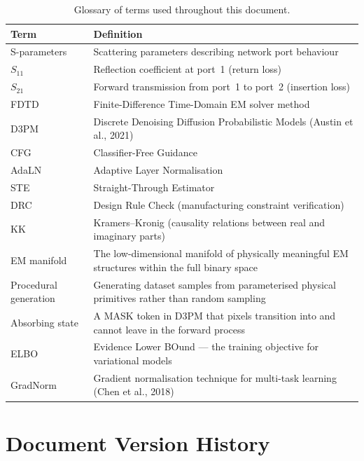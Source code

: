 \documentclass[12pt,a4paper]{article}
\theoremstyle{definition}
\theoremstyle{plain}
\theoremstyle{remark}
\begin{document}
\begin{table}[H]
\centering
\caption{Glossary of terms used throughout this document.}
\label{tab:glossary}
\begin{tabularx}{\linewidth}{lX}
\toprule
\textbf{Term} & \textbf{Definition} \\
\midrule
S-parameters    & Scattering parameters describing network port behaviour \\
$S_{11}$        & Reflection coefficient at port~1 (return loss) \\
$S_{21}$        & Forward transmission from port~1 to port~2 (insertion loss) \\
FDTD            & Finite-Difference Time-Domain EM solver method \\
D3PM            & Discrete Denoising Diffusion Probabilistic Models (Austin et al., 2021) \\
CFG             & Classifier-Free Guidance \\
AdaLN           & Adaptive Layer Normalisation \\
STE             & Straight-Through Estimator \\
DRC             & Design Rule Check (manufacturing constraint verification) \\
KK              & Kramers--Kronig (causality relations between real and imaginary parts) \\
EM manifold     & The low-dimensional manifold of physically meaningful EM structures
                  within the full binary space \\
Procedural generation
                & Generating dataset samples from parameterised physical primitives
                  rather than random sampling \\
Absorbing state & A MASK token in D3PM that pixels transition into and cannot leave
                  in the forward process \\
ELBO            & Evidence Lower BOund — the training objective for variational models \\
GradNorm        & Gradient normalisation technique for multi-task learning
                  (Chen et al., 2018) \\
\bottomrule
\end{tabularx}
\end{table}

\section{Document Version History}
\label{app:versions}
\end{document}
